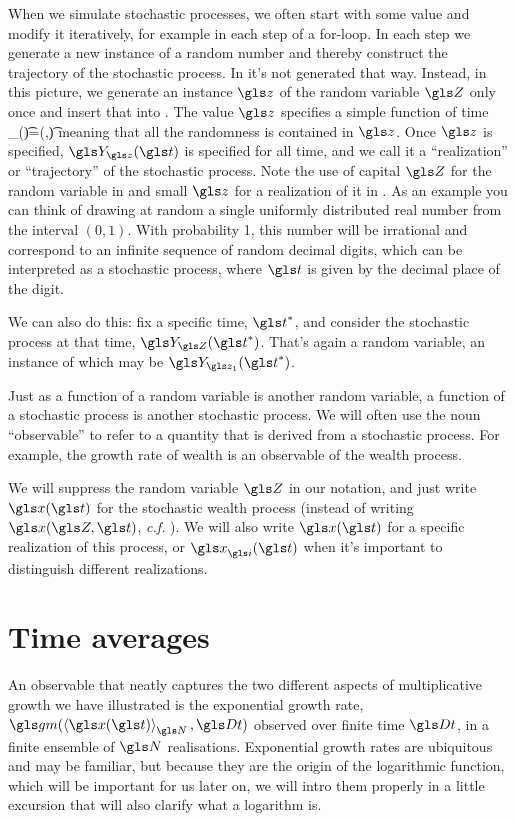 When we simulate stochastic processes, we often start with some value and modify it iteratively, for example in each step of a for-loop. In each step we generate a new instance of a random number and thereby construct the trajectory of the stochastic process. In  it's not generated that way. Instead, in this picture, we generate an instance $\z$ of the random variable $\Z$ only once and insert that into . The value $\z$ specifies a simple function of time
\be
\Y_{\z}(\t)=\gf(\z,\t)
\ee
meaning that all the randomness is contained in $\z$. Once $\z$ is specified, $\Y_{\z}(\t)$ is specified for all time, and we call it a ``realization'' or ``trajectory'' of the stochastic process. Note the use of capital $\Z$ for the random variable in  and small $\z$ for a realization of it in . As an example you can think of drawing at random a single uniformly distributed real number from the interval $(0,1)$. With probability 1, this number will be irrational and correspond to an infinite sequence of random decimal digits, which can be interpreted as a stochastic process, where $\t$ is given by the decimal place of the digit.

We can also do this: fix a specific time, $\t^*$, and consider the stochastic process at that time, $\Y_{\Z}(\t^*)$. That's again a random variable, an instance of which may be $\Y_{\z_1}(\t^*)$.

Just as a function of a random variable is another random variable, a function of a stochastic process is another stochastic process. We will often use the noun ``observable'' to refer to a quantity that is derived from a stochastic process. For example, the growth rate of wealth is an observable of the wealth process.

We will suppress the random variable $\Z$ in our notation, and just write $\x(\t)$ for the stochastic wealth process (instead of writing $\x(\Z,\t)$, {\it c.f.} ). We will also write $\x(\t)$ for a specific realization of this process, or $\x_\gi(\t)$ when it's important to distinguish different realizations.

\section{Time averages}
An observable that neatly captures the two different 
aspects of multiplicative growth we have illustrated is the exponential growth rate, $\gm(\ave{\x(\t)}_\N, \Dt)$ 
observed over finite time $\Dt$, in a finite ensemble
of $\N$ realisations. Exponential growth rates are ubiquitous and may be familiar, but because they are the origin of the logarithmic function, which will be important for us later on, we will intro them properly in a little excursion that will also clarify what a logarithm is.

